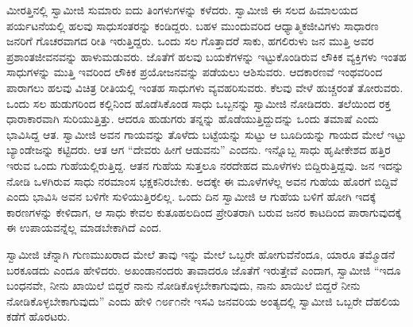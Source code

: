 ಮೀರತ್ತಿನಲ್ಲಿ ಸ್ವಾಮೀಜಿ ಸುಮಾರು ಐದು ತಿಂಗಳುಗಳನ್ನು ಕಳೆದರು. ಸ್ವಾಮೀಜಿ ಈ ಸಲದ ಹಿಮಾಲಯದ ಪರ್ಯಟನೆಯಲ್ಲಿ ಹಲವು ಸಾಧುಸಂತರನ್ನು ಕಂಡಿದ್ದರು. ಬಹಳ ಮುಂದುವರಿದ ಆಧ್ಯಾತ್ಮಿಕಜೀವಿಗಳು ಸಾಧಾರಣ ಜನರಿಗೆ ಗೊಚರವಾಗದ ರೀತಿ ಇರುತ್ತಿದ್ದರು. ಒಂದು ಸಲ ಗೊತ್ತಾದರೆ ಸಾಕು, ಹಗಲಿರುಳು ಜನ ಮುತ್ತಿ ಅವರ ಪ್ರಶಾಂತಜೀವನವನ್ನು ಹಾಳುಮಡುವರು. ಜೊತೆಗೆ ಹಲವು ಬಯಕೆಗಳನ್ನು ಇಟ್ಟುಕೊಂಡಿರುವ ಲೌಕಿಕ ವ್ಯಕ್ತಿಗಳು ಇಂತಹ ಸಾಧುಗಳನ್ನು ಮುತ್ತಿ ಇವರಿಂದ ಲೌಕಿಕ ಪ್ರಯೋಜನವನ್ನು ಪಡೆಯಲು ಆಶಿಸುವರು. ಆದಕಾರಣವೆ ಇಂಥವರಿಂದ ಪಾರಾಗಲು ಹಲವು ವಿಚಿತ್ರ ರೀತಿಯಲ್ಲಿ ಇಂತಹ ಸಾಧುಗಳು ವ್ಯವಹರಿಸುವರು. ಕೆಲವು ವೇಳೆ ಹುಚ್ಚರಂತೆ ತೋರುವರು. ಒಂದು ಸಲ ಹುಡುಗರಿಂದ ಕಲ್ಲಿನಿಂದ ಹೊಡೆಸಿಕೊಂಡ ಸಾಧು ಒಬ್ಬನನ್ನು ಸ್ವಾಮೀಜಿ ನೋಡಿದರು. ತಲೆಯಿಂದ ರಕ್ತ ಧಾರಾಕಾರವಾಗಿ ಸುರಿಯುತ್ತಿತ್ತು. ಆದರೂ ಹುಡುಗರು ತನ್ನನ್ನು ಹೊಡೆಯುತ್ತಿದ್ದುದನ್ನು ಒಂದು ತಮಾಷೆ ಎಂದು ಭಾವಿಸಿದ್ದ ಆತ. ಸ್ವಾಮೀಜಿ ಅವನ ಗಾಯವನ್ನು ತೊಳೆದು ಬಟ್ಟೆಯನ್ನು ಸುಟ್ಟು ಆ ಬೂದಿಯನ್ನು ಗಾಯದ ಮೇಲೆ ಇಟ್ಟು ಬ್ಯಾಂಡೇಜನ್ನು ಕಟ್ಟಿದರು. ಆತ ಆಗ “ದೇವರು ಹೀಗೆ ಆಡುವನು” ಎಂದನು. ಇನ್ನೊಬ್ಬ ಸಾಧು ಹೃಷೀಕೇಶದ ಹತ್ತಿರ ಇರುವ ಒಂದು ಗುಹೆಯಲ್ಲಿರುತ್ತಿದ್ದ. ಆತನ ಗುಹೆಯ ಸುತ್ತಲೂ ನರದೇಹದ ಮೂಳೆಗಳು ಬಿದ್ದಿರುತ್ತಿದ್ದವು. ಜನ ಇದನ್ನು ನೋಡಿ ಒಳಗಿರುವ ಸಾಧು ನರಮಾಂಸ ಭಕ್ಷಕನಿರಬೇಕು. ಅದಕ್ಕೇ ಈ ಮೂಳೆಗಳೆಲ್ಲ ಅವನ ಗುಹೆಯ ಹೊರಗೆ ಬಿದ್ದಿವೆ ಎಂದು ಭಾವಿಸಿ ಅವನ ಬಳಿಗೇ ಸುಳಿಯುತ್ತಿರಲಿಲ್ಲ. ಒಂದು ದಿನ ಸ್ವಾಮೀಜಿ ಆ ಗುಹೆಯ ಬಳಿಗೆ ಹೋಗಿ ಇದಕ್ಕೆ ಕಾರಣಗಳನ್ನು ಕೇಳಿದಾಗ, ಆ ಸಾಧು ಕೇವಲ ಕುತೂಹಲದಿಂದ ಪ್ರೇರಿತರಾಗಿ ಬರುವ ಜನರ ಕಾಟದಿಂದ ಪಾರಾಗುವುದಕ್ಕೆ ಈ ಉಪಾಯವನ್ನೆಲ್ಲ ಮಾಡಬೇಕಾಗಿದೆ ಎಂದ. 

ಸ್ವಾಮೀಜಿ ಚೆನ್ನಾಗಿ ಗುಣಮುಖರಾದ ಮೇಲೆ ತಾವು ಇನ್ನು ಮೇಲೆ ಒಬ್ಬರೇ ಹೋಗುವೆನೆಂದೂ, ಯಾರೂ ತಮ್ಮೊಡನೆ ಬರಕೂಡದು ಎಂದೂ ಹೇಳಿದರು. ಅಖಂಡಾನಂದರು ತಾವಾದರೂ ಜೊತೆಗೆ ಇರುತ್ತೇವೆ ಎಂದಾಗ, ಸ್ವಾಮೀಜಿ “ಇದೂ ಬಂಧನವೇ, ನೀನು ಖಾಯಿಲೆ ಬಿದ್ದರೆ ನಾನು ನೋಡಿಕೊಳ್ಳಬೇಕಾಗುವುದು, ನಾನು ಖಾಯಿಲೆ ಬಿದ್ದರೆ ನೀನು ನೋಡಿಕೊಳ್ಳಬೇಕಾಗುವುದು” ಎಂದು ಹೇಳಿ ೧೮೯೧ನೇ ಇಸವಿ ಜನವರಿಯ ಅಂತ್ಯದಲ್ಲಿ ಸ್ವಾಮೀಜಿ ಒಬ್ಬರೇ ದೆಹಲಿಯ ಕಡೆಗೆ ಹೊರಟರು. 

